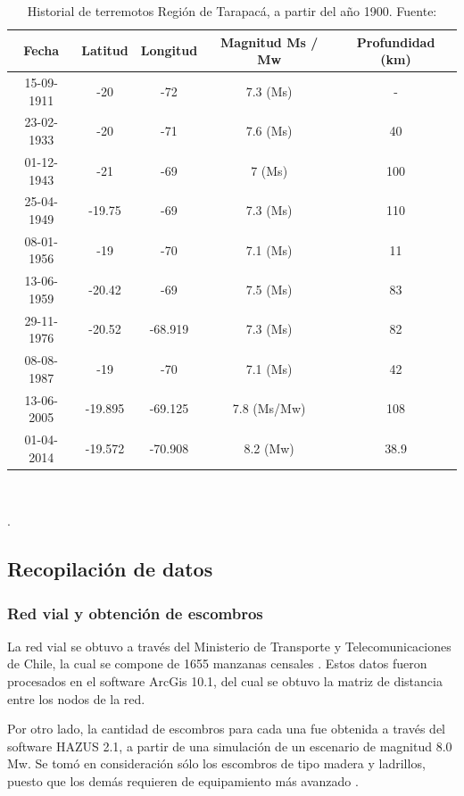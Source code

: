 \documentclass[12pt,a4paper]{article}
\begin{document}
\begin{table}[h!]
	\centering
	\begin{tabular}{c|c|c|c|c} \hline
	Fecha	& Latitud &	Longitud & Magnitud  Ms / Mw & Profundidad (km) \\ \hline
	15-09-1911  & -20	& -72 	 & 7.3 (Ms) & - \\ 
	23-02-1933  & -20   & -71	 & 7.6 (Ms) & 40  \\ 
	01-12-1943  & -21	& -69    & 7   (Ms) & 100 \\ 
	25-04-1949	& -19.75& -69	 & 7.3 (Ms) & 110 \\ 
	08-01-1956	& -19   & -70	 & 7.1 (Ms) & 11 \\ 
	13-06-1959	& -20.42& -69 	 & 7.5 (Ms) & 83 \\ 
	29-11-1976 	& -20.52& -68.919& 7.3 (Ms) & 82  \\ 
	08-08-1987	& -19	& -70	 & 7.1 (Ms) & 42  \\ 
	13-06-2005	& -19.895&-69.125& 7.8 (Ms/Mw) & 108 \\ 
	01-04-2014	& -19.572&-70.908& 8.2 (Mw) & 38.9  \\ \hline
	\end{tabular}
	\\
	\caption{Historial de terremotos Región de Tarapacá, a partir del año 1900. Fuente: \citep{guc}}.
	\label{tab:tab1} 
\end{table}

\subsection{Recopilación de datos}

\subsubsection{Red vial y obtención de escombros}

La red vial se obtuvo a través del Ministerio de Transporte y Telecomunicaciones de Chile, la cual se compone de 1655 manzanas censales \citet{CENSO2017}. Estos datos fueron procesados en el software ArcGis 10.1, del cual se obtuvo la matriz de distancia entre los nodos de la red.

Por otro lado, la cantidad de escombros para cada una fue obtenida a través del software HAZUS 2.1, a partir de una simulación de un escenario de magnitud 8.0 Mw. Se tomó en consideración sólo los escombros de tipo madera y ladrillos, puesto que los demás requieren de equipamiento más avanzado \citep{hasuz}.
\end{document}
